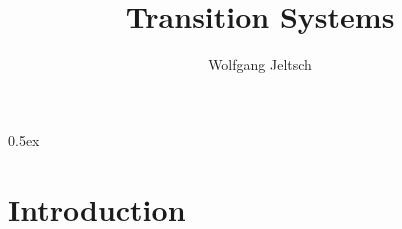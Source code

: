 \documentclass[a4paper,11pt]{article}
\begin{document}
\title{Transition Systems}
\author{Wolfgang Jeltsch}

\maketitle

\tableofcontents

\parindent 0pt\parskip 0.5ex

\section{Introduction}


\end{document}
